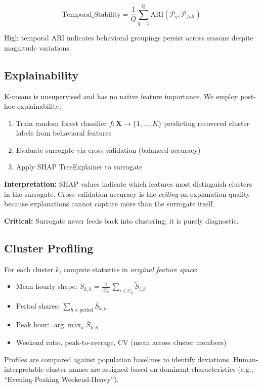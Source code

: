 \begin{equation}
\text{Temporal\_Stability} = \frac{1}{Q} \sum_{q=1}^{Q} \text{ARI}(\mathcal{P}_q, \mathcal{P}_{full})
\end{equation}

High temporal ARI indicates behavioral groupings persist across seasons despite magnitude variations.

\subsection{Explainability}
\label{sec:explainability}

K-means is unsupervised and has no native feature importance. We employ post-hoc explainability:

\begin{enumerate}
    \item Train random forest classifier $f: \mathbf{X} \rightarrow \{1, \ldots, K\}$ predicting recovered cluster labels from behavioral features
    \item Evaluate surrogate via cross-validation (balanced accuracy)
    \item Apply SHAP TreeExplainer \cite{lundberg2017shap} to surrogate
\end{enumerate}

\textbf{Interpretation:} SHAP values indicate which features most distinguish clusters in the surrogate. Cross-validation accuracy is the \emph{ceiling} on explanation quality because explanations cannot capture more than the surrogate itself.

\textbf{Critical:} Surrogate never feeds back into clustering; it is purely diagnostic.

\subsection{Cluster Profiling}

For each cluster $k$, compute statistics in \emph{original feature space}:
\begin{itemize}
    \item Mean hourly shape: $\bar{S}_{k,h} = \frac{1}{|C_k|} \sum_{i \in C_k} \tilde{S}_{i,h}$
    \item Period shares: $\sum_{h \in \text{period}} \bar{S}_{k,h}$
    \item Peak hour: $\arg\max_h \bar{S}_{k,h}$
    \item Weekend ratio, peak-to-average, CV (mean across cluster members)
\end{itemize}

Profiles are compared against population baselines to identify deviations. Human-interpretable cluster names are assigned based on dominant characteristics (e.g., ``Evening-Peaking Weekend-Heavy'').
